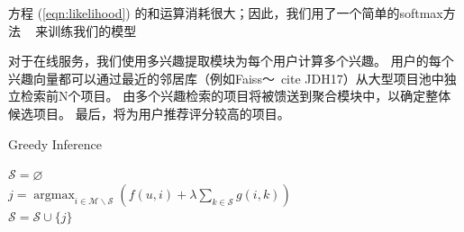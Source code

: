方程 (\ref{eqn:likelihood}) 的和运算消耗很大；因此，我们用了一个简单的softmax方法 ~\cite{jean2014using, covington2016deep} 来训练我们的模型

对于在线服务，我们使用多兴趣提取模块为每个用户计算多个兴趣。 用户的每个兴趣向量都可以通过最近的邻居库（例如Faiss〜\ cite {JDH17}）从大型项目池中独立检索前N个项目。 由多个兴趣检索的项目将被馈送到聚合模块中，以确定整体候选项目。 最后，将为用户推荐评分较高的项目。




\begin{algorithm}[t]
	\caption{Greedy Inference \label{algo:贪心推断}}
	$\mathcal{S} = \varnothing$ \\
     {
        $j = \operatorname{argmax}_{i \in \mathcal{M} \backslash \mathcal{S}} \left( f(u, i) + \lambda \sum_{k \in \mathcal{S}} g(i,k) \right)$ \\
        $\mathcal{S} = \mathcal{S} \cup \{j\}$
    }
\end{algorithm}

